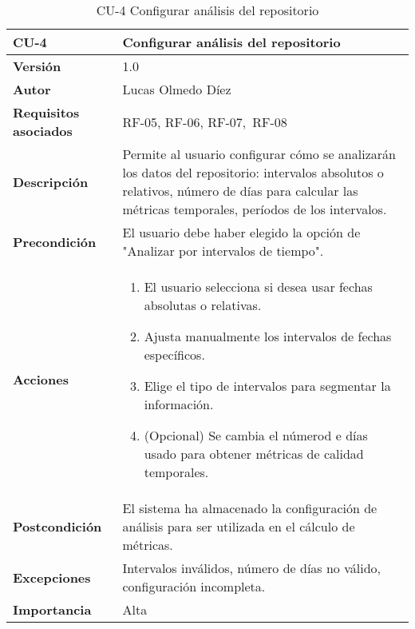\clearpage
\begin{table}[p]
    \centering
    \begin{tabularx}{\linewidth}{ p{} p{} }
        \toprule
        \textbf{CU-4} & Configurar análisis del repositorio \\
        \midrule
        \textbf{Versión} & 1.0 \\
        \textbf{Autor} & Lucas Olmedo Díez \\
        \textbf{Requisitos asociados} & RF-05, RF-06, RF-07,\ RF-08 \\
        \textbf{Descripción} & Permite al usuario configurar cómo se analizarán los datos del repositorio: intervalos absolutos o relativos, número de días para calcular las métricas temporales, períodos de los intervalos. \\
        \textbf{Precondición} & El usuario debe haber elegido la opción de "Analizar por intervalos de tiempo". \\
        \textbf{Acciones} &
        \begin{enumerate}
            \def\labelenumi{\arabic{enumi}.}
            \tightlist
            \item El usuario selecciona si desea usar fechas absolutas o relativas.
            \item Ajusta manualmente los intervalos de fechas específicos.
            \item Elige el tipo de intervalos para segmentar la información.
            \item (Opcional) Se cambia el númerod e días usado para obtener métricas de calidad temporales.
        \end{enumerate}\\
        \textbf{Postcondición} & El sistema ha almacenado la configuración de análisis para ser utilizada en el cálculo de métricas. \\
        \textbf{Excepciones} & Intervalos inválidos, número de días no válido, configuración incompleta. \\
        \textbf{Importancia} & Alta \\
        \bottomrule
    \end{tabularx}
    \caption{CU-4 Configurar análisis del repositorio}
\end{table}

